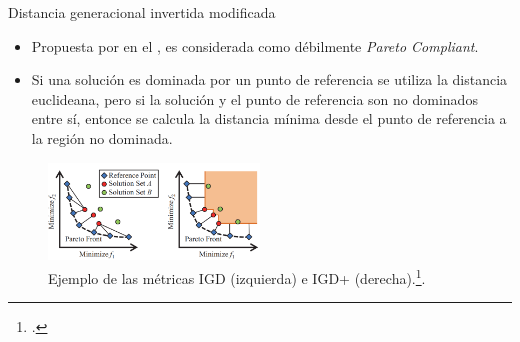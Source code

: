 \documentclass{beamer}
\begin{document}
\begin{frame}{Distancia generacional invertida modificada}
\begin{itemize}
\justifying
\scriptsize
\item Propuesta por \citeauthor{Joel:IGDPlus_And_GDPlus} en el \citeyear{Joel:IGDPlus_And_GDPlus}, es considerada como débilmente \textit{Pareto Compliant}.
\item Si una solución es dominada por un punto de referencia se utiliza la distancia euclideana, pero si la solución y el punto de referencia son no dominados entre sí, entonce se calcula la distancia mínima desde el punto de referencia a la región no dominada.
\end{itemize}
\begin{table}[]
\end{table}
\begin{figure}[H]
\centering
\includegraphics[width=0.5\textwidth]{igd.png}
\caption{\scriptsize Ejemplo de las métricas IGD (izquierda) e IGD+ (derecha).\footcite{ishibuchi2016sensitivity}.}
\end{figure}
\end{frame}
\end{document}

